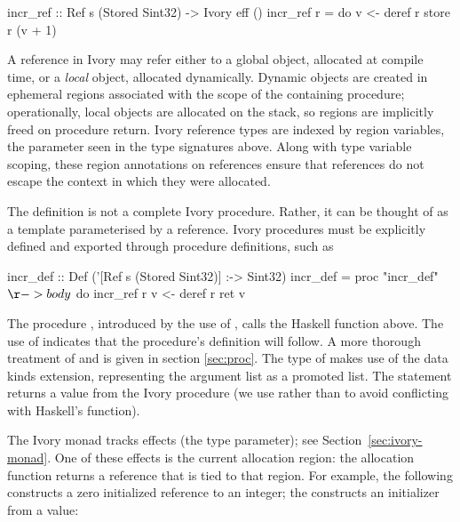 \begin{code}
incr_ref :: Ref s (Stored Sint32) -> Ivory eff ()
incr_ref r = do
    v <- deref r
    store r (v + 1)
\end{code}

\noindent
A reference in Ivory may refer either to a global object, allocated at
compile time, or a \emph{local} object, allocated dynamically.
Dynamic objects are created in ephemeral regions associated
with the scope of the containing procedure; operationally, local
objects are allocated on the stack, so regions are implicitly freed
on procedure return.  Ivory reference types are indexed by region
variables, the parameter  seen in the type signatures above.
Along with type variable scoping, these region annotations on
references ensure that references do not escape the context in which
they were allocated.

The definition  is not a complete Ivory procedure.
Rather, it can be thought of as a template parameterised by a reference.
Ivory procedures must be explicitly defined and exported through
procedure definitions, such as
\begin{code}
incr_def :: Def ('[Ref s (Stored Sint32)] :-> Sint32)
incr_def = proc "incr_def" $ \r -> body $ do
  incr_ref r
  v <- deref r
  ret v
\end{code}
\noindent
The procedure , introduced by the use of , calls the
Haskell function  above.  The use of  indicates that the
procedure's definition will follow.  A more thorough treatment of  and
 is given in section \ref{sec:proc}.  The type of  makes
use of the data kinds extension, representing the argument list as a promoted
list.  The  statement returns a value from the Ivory procedure (we use
 rather than  to avoid conflicting with Haskell's 
function).


The Ivory monad tracks effects (the  type parameter); see
Section~\ref{sec:ivory-monad}.  One of these effects is the current allocation
region: the allocation function  returns a reference that is tied to
that region.  For example, the following constructs a zero initialized reference
to an integer; the  constructs an initializer from a value:

